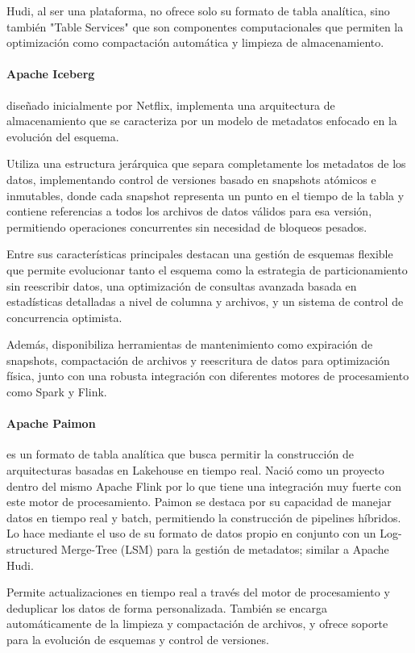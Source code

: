 Hudi, al ser una plataforma, no ofrece solo su formato de tabla analítica, 
sino también "Table Services" que son componentes computacionales que permiten la optimización como compactación automática 
y limpieza de almacenamiento. 

\newpage
\paragraph{Apache Iceberg}diseñado inicialmente por Netflix, implementa una arquitectura de almacenamiento que se caracteriza 
por un modelo de metadatos enfocado en la evolución del esquema. 

Utiliza una estructura jerárquica que separa completamente los metadatos de los datos, 
implementando control de versiones basado en snapshots atómicos e inmutables, 
donde cada snapshot representa un punto en el tiempo de la tabla y contiene referencias a todos los archivos de datos válidos para esa versión, 
permitiendo operaciones concurrentes sin necesidad de bloqueos pesados.

Entre sus características principales destacan una gestión de esquemas flexible que permite evolucionar tanto el esquema 
como la estrategia de particionamiento sin reescribir datos, 
una optimización de consultas avanzada basada en estadísticas detalladas a nivel de columna y archivos, 
y un sistema de control de concurrencia optimista. 

Además, disponibiliza herramientas de mantenimiento como expiración de snapshots, compactación de archivos 
y reescritura de datos para optimización física, 
junto con una robusta integración con diferentes motores de procesamiento como Spark y Flink.

\newpage
\paragraph{Apache Paimon} es un formato de tabla analítica que busca permitir la construcción de arquitecturas basadas en Lakehouse en tiempo real.
Nació como un proyecto dentro del mismo Apache Flink por lo que tiene una integración muy fuerte con este motor de procesamiento.
Paimon se destaca por su capacidad de manejar datos en tiempo real y batch, permitiendo la construcción de pipelines híbridos.
Lo hace mediante el uso de su formato de datos propio en conjunto con un Log-structured Merge-Tree (LSM) para la gestión de metadatos; similar a Apache Hudi.

Permite actualizaciones en tiempo real a través del motor de procesamiento y deduplicar los datos de forma personalizada. También se encarga automáticamente 
de la limpieza y compactación de archivos, y ofrece soporte para la evolución de esquemas y control de versiones.

